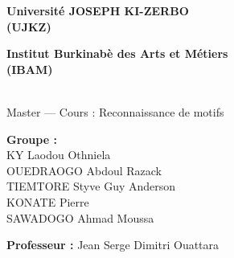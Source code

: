\documentclass[11pt,a4paper]{article}
\begin{document}
\begin{titlepage}
\thispagestyle{pagegarde}
\vspace*{\fill}
\begin{center}

{\bfseries\large Université JOSEPH KI-ZERBO}\\[1pt]
{\bfseries\large (UJKZ)}

\vspace{16pt}

{\bfseries\large Institut Burkinabè des Arts et Métiers}\\[1pt]
{\bfseries\large (IBAM)}

\vspace{12pt}
\noindent\makebox[9cm]{\dotfill}\\[2pt]
{\normalsize Master --- Cours : Reconnaissance de motifs}

\vspace{26pt}

{\fboxrule=0.8pt}
\end{center}

\vspace{2.4cm}
\textbf{Groupe :}\\
KY Laodou Othniela\\
OUEDRAOGO Abdoul Razack\\
TIEMTORE Styve Guy Anderson\\
KONATE Pierre\\
SAWADOGO Ahmad Moussa

\vspace{20pt}
\textbf{Professeur :} Jean Serge Dimitri Ouattara
\vspace*{\fill}
\end{titlepage}


\newpage

\begin{center}\Large\bfseries\sffamily\contentsname\end{center}
\vspace{16pt}
\makeatletter{}\makeatother
\newpage
\end{document}
